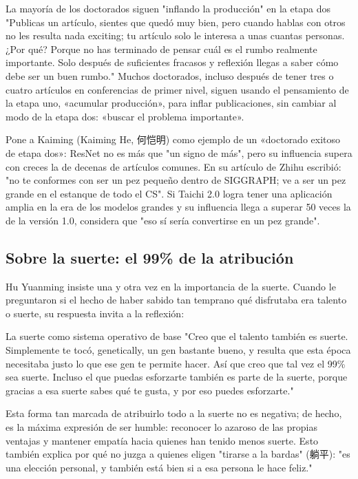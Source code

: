 \documentclass[a4paper]{article}
\begin{document}
\begin{warningbox}{La mayoría de los doctorados siguen "inflando la producción" en la etapa dos}
"Publicas un artículo, sientes que quedó muy bien, pero cuando hablas con otros no les resulta nada exciting; tu artículo solo le interesa a unas cuantas personas. ¿Por qué? Porque no has terminado de pensar cuál es el rumbo realmente importante. Solo después de suficientes fracasos y reflexión llegas a saber cómo debe ser un buen rumbo." Muchos doctorados, incluso después de tener tres o cuatro artículos en conferencias de primer nivel, siguen usando el pensamiento de la etapa uno, «acumular producción», para inflar publicaciones, sin cambiar al modo de la etapa dos: «buscar el problema importante».
\end{warningbox}

Pone a Kaiming (Kaiming He, 何恺明) como ejemplo de un «doctorado exitoso de etapa dos»: ResNet no es más que "un signo de más", pero su influencia supera con creces la de decenas de artículos comunes. En su artículo de Zhihu escribió: "no te conformes con ser un pez pequeño dentro de SIGGRAPH; ve a ser un pez grande en el estanque de todo el CS". Si Taichi 2.0 logra tener una aplicación amplia en la era de los modelos grandes y su influencia llega a superar 50 veces la de la versión 1.0, considera que "eso sí sería convertirse en un pez grande".

\subsection{Sobre la suerte: el 99\% de la atribución}

Hu Yuanming insiste una y otra vez en la importancia de la suerte. Cuando le preguntaron si el hecho de haber sabido tan temprano qué disfrutaba era talento o suerte, su respuesta invita a la reflexión:

\begin{importantbox}{La suerte como sistema operativo de base}
"Creo que el talento también es suerte. Simplemente te tocó, genetically, un gen bastante bueno, y resulta que esta época necesitaba justo lo que ese gen te permite hacer. Así que creo que tal vez el 99\% sea suerte. Incluso el que puedas esforzarte también es parte de la suerte, porque gracias a esa suerte sabes qué te gusta, y por eso puedes esforzarte."
\end{importantbox}

Esta forma tan marcada de atribuirlo todo a la suerte no es negativa; de hecho, es la máxima expresión de ser humble: reconocer lo azaroso de las propias ventajas y mantener empatía hacia quienes han tenido menos suerte. Esto también explica por qué no juzga a quienes eligen "tirarse a la bardas" (躺平): "es una elección personal, y también está bien si a esa persona le hace feliz."
\end{document}
